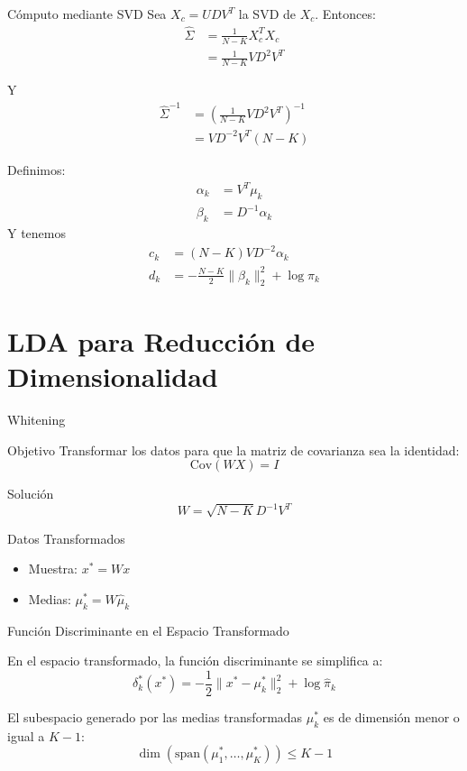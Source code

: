 \documentclass[spanish]{beamer}
\begin{document}
\begin{frame}{Cómputo mediante SVD}
Sea $X_c = U D V^T$ la SVD de $X_c$. Entonces:
\begin{align*}
\hat{\Sigma} &= \frac{1}{N - K} X_c^T X_c \\
&= \frac{1}{N - K} V D^2 V^T
\end{align*}

Y
\begin{align*}
    \hat{\Sigma}^{-1} &= \left( \frac{1}{N-K} VD^{2}V^{T} \right)^{-1} \\
    & = VD^{-2}V^{T} (N-K)
\end{align*}

\end{frame}
\begin{frame}
Definimos:
\begin{align*}
    \alpha_k &= V^T \mu_k \\
    \beta_k &= D^{-1} \alpha_k
\end{align*}
Y tenemos
\begin{align*}
c_k &= (N-K) V D^{-2} \alpha_k \\
d_k &= -\frac{N-K}{2} \|\beta_k\|_2^2 + \log \pi_k
\end{align*}
\end{frame}

\section{LDA para Reducción de Dimensionalidad}

\begin{frame}{Whitening}
\begin{block}{Objetivo}
Transformar los datos para que la matriz de covarianza sea la identidad:
\[
\text{Cov}(WX) = I
\]
\end{block}

\begin{block}{Solución}
\[
W = \sqrt{N-K}D^{-1}V^T
\]
\end{block}

\begin{block}{Datos Transformados}
\begin{itemize}
    \item Muestra: $x^* = Wx$
    \item Medias: $\mu_k^* = W\hat{\mu}_k$
\end{itemize}
\end{block}
\end{frame}

\begin{frame}{Función Discriminante en el Espacio Transformado}
\begin{definition}
En el espacio transformado, la función discriminante se simplifica a:
\[
\delta_k^*(x^*) = -\frac{1}{2}\|x^* - \mu_k^*\|_2^2 + \log \hat{\pi}_k
\]
\end{definition}

\begin{theorem}
El subespacio generado por las medias transformadas $\mu_k^*$ es de dimensión menor o igual a $K-1$:
\[
\dim(\mathrm{span}(\mu_1^*, \ldots, \mu_K^*)) \leq K-1
\]
\end{theorem}
\end{frame}
\end{document}
